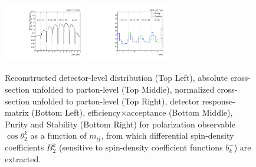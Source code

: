 \begin{figure}[htb]
\begin{center}
 \includegraphics[width=0.32\textwidth]{fig_fullRun2UL/unfolding/combined/TotEff_b2k_mttbar.pdf}
 \includegraphics[width=0.32\textwidth]{fig_fullRun2UL/unfolding/combined/PurStab_b2k_mttbar.pdf} \\
\caption{Reconstructed detector-level distribution (Top Left), absolute cross-section unfolded to parton-level (Top Middle), normalized cross-section unfolded to parton-level (Top Right), detector response-matrix (Bottom Left), efficiency$\times$acceptance (Bottom Middle), Purity and Stability (Bottom Right) for polarization observable $\cos\theta_{2}^{k}$ as a function of $m_{t\bar{t}}$, from which differential spin-density coefficients $B_{2}^{k}$ (sensitive to spin-density coefficient functions $b_k^{-}$) are extracted.}
\label{fig:b2k_mttbar}
\end{center}
\end{figure}
\clearpage
